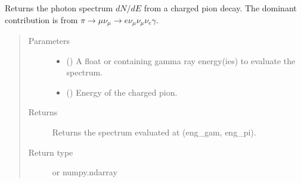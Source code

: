 \documentclass[letterpaper,10pt,english]{sphinxmanual}
\begin{document}
\begin{fulllineitems}
\label{\detokenize{Modules:charged_pion.decay_spectra}}
Returns the photon spectrum \(dN/dE\) from a charged pion decay. The dominant contribution is from \(\pi\to\mu\nu_{\mu}\to e\nu_{\mu}\nu_{\mu}\nu_{e}\gamma\).
\begin{quote}\begin{description}
\item[{Parameters}] \leavevmode\begin{itemize}
\item {} 
 () \textendash{} A float or  containing gamma ray energy(ies) to evaluate the spectrum.

\item {} 
 () \textendash{} Energy of the charged pion.

\end{itemize}

\item[{Returns}] \leavevmode
Returns the spectrum evaluated at (eng\_gam, eng\_pi).

\item[{Return type}] \leavevmode
{} or numpy.ndarray

\end{description}\end{quote}

\end{fulllineitems}

\end{document}
